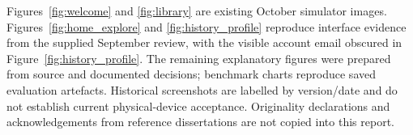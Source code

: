 Figures~\ref{fig:welcome} and \ref{fig:library} are existing October simulator images. Figures~\ref{fig:home_explore} and \ref{fig:history_profile} reproduce interface evidence from the supplied September review, with the visible account email obscured in Figure~\ref{fig:history_profile}. The remaining explanatory figures were prepared from source and documented decisions; benchmark charts reproduce saved evaluation artefacts. Historical screenshots are labelled by version/\allowbreak{}date and do not establish current physical-device acceptance. Originality declarations and acknowledgements from reference dissertations are not copied into this report.
